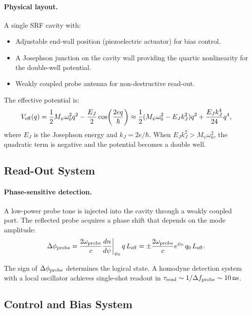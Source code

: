 \documentclass[12pt,a4paper,twoside]{article}
\begin{document}
\paragraph{Physical layout.} A single SRF cavity with:
\begin{itemize}
\item Adjustable end-wall position (piezoelectric actuator) for bias control.
\item A Josephson junction on the cavity wall providing the quartic nonlinearity for the double-well potential.
\item Weakly coupled probe antenna for non-destructive read-out.
\end{itemize}

The effective potential is:
\begin{equation}
V_{\rm eff}(q) = \frac{1}{2}M_\psi\omega_0^2 q^2 - \frac{E_J}{2}\cos\!\left(\frac{2eq}{\hbar}\right) \approx \frac{1}{2}(M_\psi\omega_0^2 - E_J k_J^2)q^2 + \frac{E_J k_J^4}{24}q^4,
\end{equation}
where $E_J$ is the Josephson energy and $k_J = 2e/\hbar$. When $E_J k_J^2 > M_\psi\omega_0^2$, the quadratic term is negative and the potential becomes a double well.

\subsection{Read-Out System}\label{sec:readout}

\paragraph{Phase-sensitive detection.} A low-power probe tone is injected into the cavity through a weakly coupled port. The reflected probe acquires a phase shift that depends on the mode amplitude:
\begin{equation}
\Delta\phi_{\rm probe} = \frac{2\omega_{\rm probe}}{c}\frac{dn}{d\psi}\bigg|_{\psi_0}\,q\,L_{\rm eff} = \pm\frac{2\omega_{\rm probe}}{c}e^{\psi_0}\,q_0\,L_{\rm eff}.
\end{equation}

The sign of $\Delta\phi_{\rm probe}$ determines the logical state. A homodyne detection system with a local oscillator achieves single-shot readout in $\tau_{\rm read} \sim 1/\Delta f_{\rm probe} \sim 10\,\si{ns}$.

\subsection{Control and Bias System}\label{sec:control}
\end{document}
